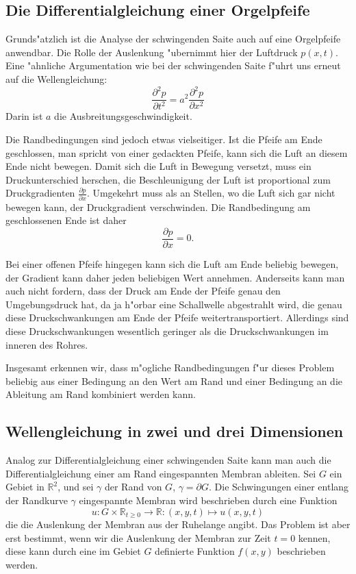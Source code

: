 \subsection{Die Differentialgleichung einer Orgelpfeife\label{beispiele:orgelpfeife}}
Grunds"atzlich ist die Analyse der schwingenden Saite auch auf
eine Orgelpfeife anwendbar. Die Rolle der Auslenkung "ubernimmt
hier der Luftdruck $p(x,t)$. Eine "ahnliche Argumentation wie bei
der schwingenden Saite f"uhrt uns erneut auf die Wellengleichung:
\[
\frac{\partial^2p}{\partial t^2}=
a^2\frac{\partial^2p}{\partial x^2}
\]
Darin ist $a$ die Ausbreitungsgeschwindigkeit.

Die Randbedingungen sind jedoch etwas vielseitiger.
Ist die Pfeife am Ende geschlossen, man spricht von
einer gedackten Pfeife, kann sich die Luft an diesem Ende nicht bewegen.
Damit sich die Luft in Bewegung versetzt, muss ein Druckunterschied herschen,
die Beschleunigung der Luft ist proportional zum Druckgradienten
$\frac{\partial p}{\partial x}$. Umgekehrt muss als an Stellen, wo die
Luft sich gar nicht bewegen kann, der Druckgradient verschwinden.
Die Randbedingung am geschlossenen Ende ist daher
\[
\frac{\partial p}{\partial x}=0.
\]

Bei einer offenen Pfeife hingegen kann sich die Luft am Ende beliebig
bewegen, der Gradient kann daher jeden beliebigen Wert annehmen.
Anderseits kann man auch nicht fordern, dass der Druck am
Ende der Pfeife genau den Umgebungsdruck hat, da ja h"orbar eine
Schallwelle abgestrahlt wird, die genau diese Druckschwankungen am
Ende der Pfeife weitertransportiert. Allerdings sind diese Druckschwankungen
wesentlich geringer als die Druckschwankungen im inneren des Rohres.

Insgesamt erkennen wir, dass m"ogliche Randbedingungen f"ur dieses Problem
beliebig aus einer Bedingung an den Wert am Rand und einer Bedingung
an die Ableitung am Rand kombiniert werden kann.

\subsection{Wellengleichung in zwei und drei Dimensionen\label{beispiele:wellengleichung2d}}
Analog zur Differentialgleichung einer schwingenden Saite kann
man auch die Differentialgleichung einer am Rand eingespannten Membran
ableiten.
Sei $G$ ein Gebiet in $\mathbb R^2$, und sei $\gamma$ der Rand
von $G$, $\gamma = \partial G$. Die Schwingungen einer entlang der Randkurve
$\gamma$ eingespannte Membran wird beschrieben durch eine Funktion
\[
 u \colon G\times \mathbb R_{t \ge 0}\to\mathbb R\colon (x,y,t)\mapsto  u (x,y,t)
\]
die die Auslenkung der Membran aus der Ruhelange angibt. Das Problem ist aber
erst bestimmt, wenn wir die Auslenkung der Membran zur Zeit $t=0$ kennen,
diese kann durch eine im Gebiet $G$ definierte Funktion $f(x,y)$ beschrieben
werden.

